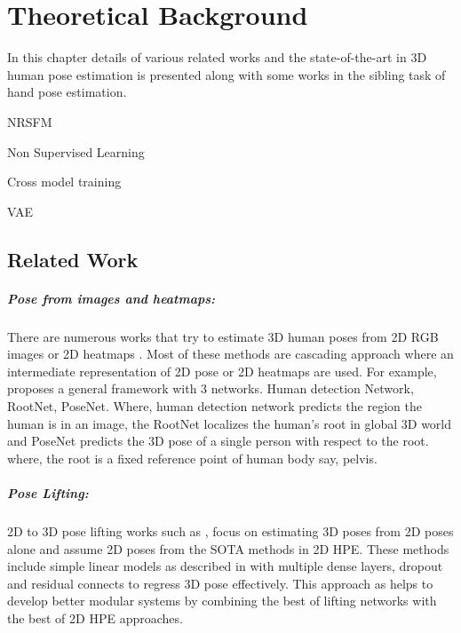 \chapter{Theoretical Background}
\label{chap:background}
In this chapter details of various related works and the state-of-the-art in 3D human pose estimation is presented along with some works in the sibling task of hand pose estimation.

NRSFM

Non Supervised Learning

Cross model training

VAE

\section{Related Work}
\label{sec:relatedwork}

\paragraph{Pose from images and heatmaps:}
There are numerous works that try to estimate 3D human poses from 2D \ac{RGB} images or 2D heatmaps \cite{CameraDistanceAware, poselifter, DistillNRSfM, occlusionVideo}.  Most of these methods are cascading approach where an intermediate representation of 2D pose or 2D heatmaps are used. For example, \cite{CameraDistanceAware} proposes a general framework with 3 networks. Human detection Network, RootNet, PoseNet. Where, human detection network predicts the region the human is in an image, the RootNet localizes the human's root in global 3D world and PoseNet predicts the 3D pose of a single person with respect to the root. where, the root is a fixed reference point of human body say, pelvis.

\paragraph{Pose Lifting:}
2D to 3D pose lifting works such as \cite{poselifter,  amazon1, repnet, c3dpo, unsupervisedAdversarial}, focus on estimating 3D poses from 2D poses alone and assume 2D poses from the \ac{SOTA} methods in 2D \ac{HPE}. These methods include simple linear models as described in \cite{MartinezHRL17} with multiple dense layers, dropout and residual connects to regress 3D pose effectively. This approach as helps to develop better modular systems by combining the best of lifting networks with the best of 2D \ac{HPE} approaches.  


